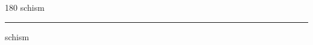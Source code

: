 
\begin{frame}
\begin{center}
\begin{turn}{180}
{\fontsize{2.5cm}{1em}\selectfont schism}
\end{turn}
\vspace{1em}\par  
\hrule
\vspace{1em}\par  
{\fontsize{2.5cm}{1em}\selectfont schism}
\end{center}
\end{frame}
